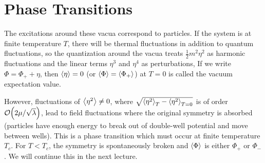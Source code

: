 \documentclass[a4paper,twoside,master.tex]{subfiles}
\begin{document}
\section{Phase Transitions}\label{sec:phase_transitions}

The excitations around these vacua correspond to particles. If the system is at finite temperature $ T $, there will be thermal fluctuations in addition to quantum fluctuations, so the quantization around the vacua treats $ \frac{1}{2} m^2 \eta^2 $ as harmonic fluctuations and the linear terms $ \eta^3 $ and $ \eta^4 $ as perturbations, If we write $ \Phi = \Phi_+ + \eta $, then $ \ev{\eta} = 0 $ (or $ \ev{\Phi} = \ev{\Phi_+} $) at $ T = 0 $ is called the vacuum expectation value.

However, fluctuations of $ \ev{\eta^2} \neq 0 $, where $ \sqrt{\ev{\eta^2}_T - \ev{\eta^2}_{T=0}} $ is of order $ \order{2 \mu / \sqrt{\lambda}} $, lead to field fluctuations where the original symmetry is absorbed (particles have enough energy to break out of double-well potential and move between wells). This is a phase transition which must occur at finite temperature $ T_c $. For $ T < T_c $, the symmetry is spontaneously broken and $ \ev{\Phi} $ is either $ \Phi_+ $ or $ \Phi_- $. We will continue this in the next lecture.
\end{document}
